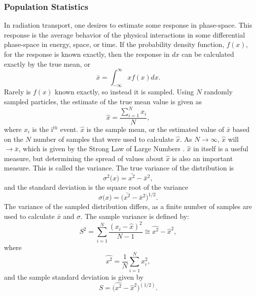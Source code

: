 \subsubsection{Population Statistics}
\label{subsubsec:PopStat}

In radiation transport, one desires to estimate some response in phase-space.
This response is the average behavior of the physical interactions in some
differential phase-space in energy, space, or time. If the probability density
function, $f(x)$, for the response is known exactly,
then the response in $dx$ can be calculated exactly by the true
mean, or
\begin{equation}
  \bar{x} = \int_{-\infty}^{\infty} xf(x) dx .
\end{equation}
Rarely is $f(x)$ known
exactly, so instead it is sampled.
Using $N$ randomly sampled particles, the estimate of the true mean value is given as
\begin{equation}
  \hat{x} = \frac{\sum_{i=1}^{N}{x_i}}{N} ,
\end{equation}
where $x_i$ is the i$^{th}$ event. $\hat{x}$ is the sample mean, or the
estimated value of $\bar{x}$
based on the $N$ number of samples that were used to calculate $\hat{x}$. As $N
\rightarrow \infty$, $\hat{x}$ will $\rightarrow \bar{x}$, which is given by the
Strong Law of Large Numbers \cite{mcnp_manual_v1}.
$\hat{x}$ in itself is a useful measure, but determining the spread of values
about $\hat{x}$ is also an important measure. This is called the variance. The
true variance of the distribution is
\begin{equation}
  \sigma^{2}\big( x \big) = \bar{x^2} - \bar{x}^2 ,
\end{equation}
and the standard deviation is the square root of the variance
\begin{equation}
  \sigma\big(x \big) = \big( \bar{x^2} - \bar{x}^2 \big)^{1/2}.
\end{equation}
The variance of the sampled distribution differs, as a finite number of samples
are used to calculate $\bar{x}$ and $\sigma$. The sample variance is defined by:
\begin{equation}
S^{ 2 }=\sum _{ i=1 }^{ N }{ \frac { (x_{ i }-\hat { x } )^{ 2 } }{ N-1 }  }
             \cong \widehat{x^2}-\hat{x}^2 ,
\label{eq:Var}
\end{equation}
where
\begin{equation}
  \widehat{x^2} = \frac{1}{N}\sum_{i=1}^{N} x_i^2 ,
\end{equation}
and the sample standard deviation is given by
\begin{equation}
  S = \big( \widehat{x^2}-\hat{x}^2 \big)^{(1/2)} .
\end{equation}

